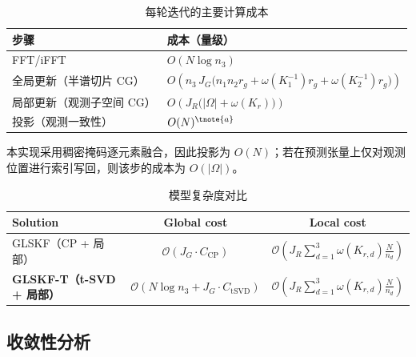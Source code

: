 \documentclass[UTF8]{ctexart}
\begin{document}
\begin{table}[!htbp]
\centering
\caption{每轮迭代的主要计算成本}
\label{tab:complexity1}

\begin{threeparttable}
\begin{tabular}{l l}
\toprule
步骤 & 成本（量级）\\
\midrule
FFT/iFFT & $O(N\log n_3)$ \\
全局更新（半谱切片 CG） &
$O\!\left(n_3\,J_G\big(n_1n_2r_g+\omega(K_1^{-1})r_g+\omega(K_2^{-1})r_g\big)\right)$ \\
局部更新（观测子空间 CG） &
$O\!\left(J_R\big(|\Omega|+\omega(K_r)\big)\right)$ \\
投影（观测一致性） & $O(N)^{\tnote{a}}$ \\
\bottomrule
\end{tabular}

\begin{tablenotes}[flushleft]
\footnotesize
\item[a] 本实现采用稠密掩码逐元素融合，因此投影为 $O(N)$；若在预测张量上仅对观测位置进行索引写回，则该步的成本为 $O(|\Omega|)$。
\end{tablenotes}
\end{threeparttable}
\end{table}


\begin{table}[!htbp]


\centering
\caption{模型复杂度对比}
\label{tab:complexity2}
\begin{tabular}{l cc}
\toprule
Solution & Global cost & Local cost \\\midrule
GLSKF（CP + 局部）& $\mathcal{O}\!\left(J_G\cdot C_{\text{CP}}\right)$ & $\mathcal{O}\!\left(J_R \sum_{d=1}^{3}\omega(K_{r,d})\frac{N}{n_d}\right)$ \\
\textbf{GLSKF-T（t-SVD + 局部）}& $\mathcal{O}\!\left(N\log n_3 + J_G\cdot C_{\text{tSVD}}\right)$ & $\mathcal{O}\!\left(J_R \sum_{d=1}^{3}\omega(K_{r,d})\frac{N}{n_d}\right)$ \\
\bottomrule
\end{tabular}


\vspace{2pt}
\end{table}

\subsection{收敛性分析}
\label{sec:convergence}
\end{document}
